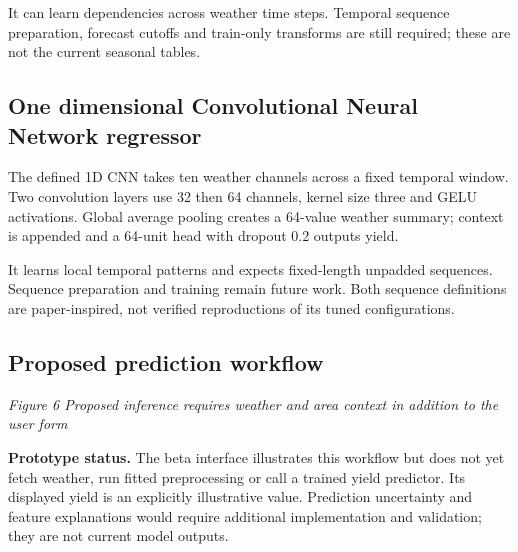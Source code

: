 \documentclass[11pt,a4paper]{article}
\begin{document}
It can learn dependencies across weather time steps. Temporal sequence preparation, forecast cutoffs and train-only transforms are still required; these are not the current seasonal tables.

\subsection*{One dimensional Convolutional Neural Network regressor}
The defined 1D CNN takes ten weather channels across a fixed temporal window. Two convolution layers use 32 then 64 channels, kernel size three and GELU activations. Global average pooling creates a 64-value weather summary; context is appended and a 64-unit head with dropout 0.2 outputs yield.

It learns local temporal patterns and expects fixed-length unpadded sequences. Sequence preparation and training remain future work. Both sequence definitions are paper-inspired, not verified reproductions of its tuned configurations.

\subsection*{Proposed prediction workflow}
\begin{center}\end{center}
{\footnotesize\itshape Figure 6  Proposed inference requires weather and area context in addition to the user form}\par
\textbf{Prototype status.} The beta interface illustrates this workflow but does not yet fetch weather, run fitted preprocessing or call a trained yield predictor. Its displayed yield is an explicitly illustrative value. Prediction uncertainty and feature explanations would require additional implementation and validation; they are not current model outputs.
\end{document}
